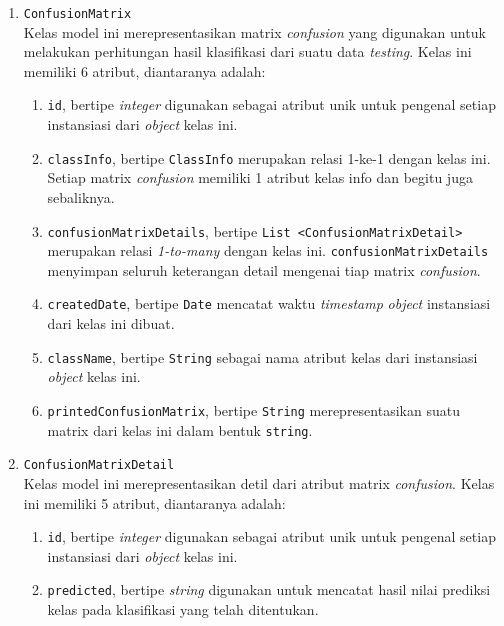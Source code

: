 \begin{enumerate}
	\item \texttt{ConfusionMatrix}\\
	Kelas model ini merepresentasikan matrix \textit{confusion} yang digunakan untuk melakukan perhitungan hasil klasifikasi dari suatu data \textit{testing}. Kelas ini memiliki 6 atribut, diantaranya adalah:
	\begin{enumerate}
		\item \texttt{id}, bertipe \textit{integer} digunakan sebagai atribut unik untuk pengenal setiap instansiasi dari \textit{object} kelas ini.

		\item \texttt{classInfo}, bertipe \texttt{ClassInfo} merupakan relasi 1-ke-1 dengan kelas ini. Setiap matrix \textit{confusion} memiliki 1 atribut kelas info dan begitu juga sebaliknya.
	
		\item \texttt{confusionMatrixDetails}, bertipe \texttt{List <ConfusionMatrixDetail>} merupakan relasi \textit{1-to-many} dengan kelas ini. \texttt{confusionMatrixDetails} menyimpan seluruh keterangan detail mengenai tiap matrix \textit{confusion}.

		\item \texttt{createdDate}, bertipe \texttt{Date} mencatat waktu \textit{timestamp} \textit{object} instansiasi dari kelas ini dibuat.		

		\item \texttt{className}, bertipe \texttt{String} sebagai nama atribut kelas dari instansiasi \textit{object} kelas ini.

		\item \texttt{printedConfusionMatrix}, bertipe \texttt{String} merepresentasikan suatu matrix dari kelas ini dalam bentuk \texttt{string}.

	\end{enumerate}		
	
	\item \texttt{ConfusionMatrixDetail}\\
	Kelas model ini merepresentasikan detil dari atribut matrix \textit{confusion}. Kelas ini memiliki 5 atribut, diantaranya adalah:
	\begin{enumerate}
		\item \texttt{id}, bertipe \textit{integer} digunakan sebagai atribut unik untuk pengenal setiap instansiasi dari \textit{object} kelas ini.
				

		\item \texttt{predicted}, bertipe \textit{string} digunakan untuk mencatat hasil nilai prediksi kelas pada klasifikasi yang telah ditentukan.
		


\end{enumerate}
\end{enumerate}
